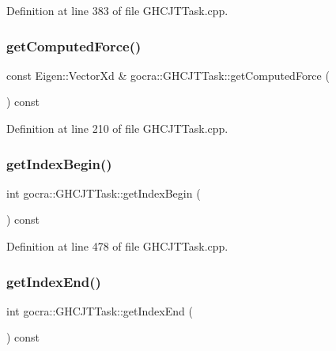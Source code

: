 Definition at line 383 of file G\+H\+C\+J\+T\+Task.\+cpp.

\hypertarget{classgocra_1_1GHCJTTask_a088d67ee49cbdc57ad2b77e2d89afae0}{}\label{classgocra_1_1GHCJTTask_a088d67ee49cbdc57ad2b77e2d89afae0} 
\subsubsection{\texorpdfstring{get\+Computed\+Force()}{getComputedForce()}}
{\footnotesize\ttfamily const Eigen\+::\+Vector\+Xd \& gocra\+::\+G\+H\+C\+J\+T\+Task\+::get\+Computed\+Force (\begin{DoxyParamCaption}{ }\end{DoxyParamCaption}) const}



Definition at line 210 of file G\+H\+C\+J\+T\+Task.\+cpp.

\hypertarget{classgocra_1_1GHCJTTask_ab7732146f0db17c8a7b0f1c2d7c163a1}{}\label{classgocra_1_1GHCJTTask_ab7732146f0db17c8a7b0f1c2d7c163a1} 
\subsubsection{\texorpdfstring{get\+Index\+Begin()}{getIndexBegin()}}
{\footnotesize\ttfamily int gocra\+::\+G\+H\+C\+J\+T\+Task\+::get\+Index\+Begin (\begin{DoxyParamCaption}{ }\end{DoxyParamCaption}) const}



Definition at line 478 of file G\+H\+C\+J\+T\+Task.\+cpp.

\hypertarget{classgocra_1_1GHCJTTask_a4a6c3086e34d30638dae944de48dcde1}{}\label{classgocra_1_1GHCJTTask_a4a6c3086e34d30638dae944de48dcde1} 
\subsubsection{\texorpdfstring{get\+Index\+End()}{getIndexEnd()}}
{\footnotesize\ttfamily int gocra\+::\+G\+H\+C\+J\+T\+Task\+::get\+Index\+End (\begin{DoxyParamCaption}{ }\end{DoxyParamCaption}) const}



